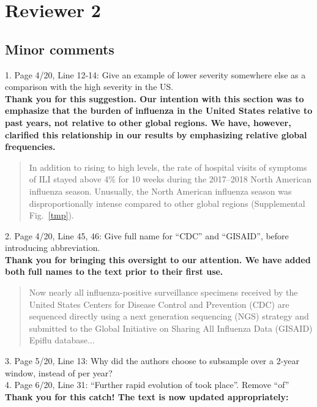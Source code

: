 \documentclass[11pt,oneside,letterpaper]{article}
\begin{document}
\section*{Reviewer 2}
\subsection*{Minor comments}
1. Page 4/20, Line 12-14: Give an example of lower severity somewhere else as a comparison with the high severity in the US.\\

\textbf{Thank you for this suggestion. Our intention with this section was to emphasize that the burden of influenza in the United States relative to past years, not relative to other global regions. We have, however, clarified this relationship in our results by emphasizing relative global frequencies.}

\begin{quotation}
  In addition to rising to high levels, the rate of hospital visits of symptoms of ILI stayed above 4\% for 10 weeks during the 2017--2018 North American influenza season.
  Unusually, the North American influenza season was disproportionally intense compared to other global regions (Supplemental Fig.~\ref{tmp}).
\end{quotation}

2. Page 4/20, Line 45, 46: Give full name for “CDC” and “GISAID”, before introducing abbreviation.\\

\textbf{Thank you for bringing this oversight to our attention. We have added both full names to the text prior to their first use.}

\begin{quotation}
Now nearly all influenza-positive surveillance specimens received by the United States Centers for Disease Control and Prevention (CDC) are sequenced directly using a next generation sequencing (NGS) strategy and submitted to the Global Initiative on Sharing All Influenza Data (GISAID) Epiflu database...
\end{quotation}

3. Page 5/20, Line 13: Why did the authors choose to subsample over a 2-year window, instead of per year?\\

4. Page 6/20, Line 31: “Further rapid evolution of took place”. Remove “of”\\

\textbf{Thank you for this catch! The text is now updated appropriately:}
\end{document}

